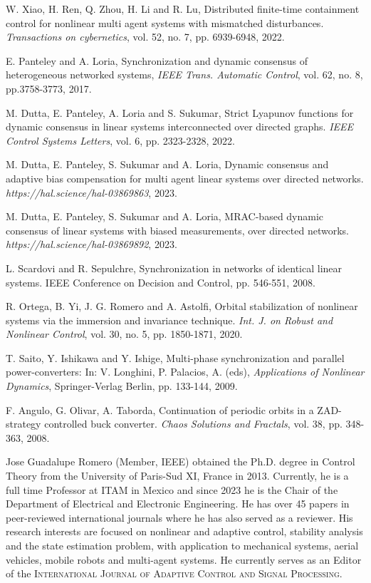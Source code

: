 \documentclass[journal,twoside]{IEEEtran}
\def\TAC{{\it IEEE Trans. Automat. Contr.}}
\def\IJRNLC{{\it Int. J. on Robust and Nonlinear Control}}
\def\TAC{{\it IEEE Trans. Automatic Control}}
\begin{document}
\begin{thebibliography}{00}
W. Xiao, H. Ren, Q. Zhou, H. Li and R. Lu, Distributed finite-time containment control for nonlinear multi agent systems with mismatched disturbances. {\it Transactions on cybernetics}, vol. 52, no. 7, pp. 6939-6948, 2022.

E. Panteley and A. Loria, Synchronization and dynamic consensus of heterogeneous networked systems, \TAC, vol. 62, no. 8, pp.3758-3773, 2017.

M. Dutta, E. Panteley, A. Loria and S. Sukumar, Strict Lyapunov functions for dynamic consensus in linear systems interconnected over directed graphs. {\it IEEE Control Systems Letters}, vol. 6, pp. 2323-2328, 2022. 

M. Dutta, E. Panteley, S. Sukumar and A. Loria, Dynamic consensus and adaptive bias
compensation for multi agent linear systems over directed networks. {\it https://hal.science/hal-03869863}, 2023.

M. Dutta, E. Panteley, S. Sukumar and A. Loria, MRAC-based dynamic consensus of linear systems with biased measurements, over directed networks. {\it https://hal.science/hal-03869892}, 2023.

L. Scardovi and R. Sepulchre, Synchronization in networks of identical linear systems. {IEEE Conference on Decision and Control}, pp. 546-551, 2008.

R. Ortega, B. Yi, J. G. Romero and A. Astolfi, Orbital stabilization of nonlinear systems via the
immersion and invariance technique. \IJRNLC, vol. 30, no. 5, pp. 1850-1871, 2020.

T. Saito, Y. Ishikawa and Y. Ishige, Multi-phase synchronization and parallel power-converters: In: V. Longhini, P. Palacios, A. (eds), {\it Applications of Nonlinear Dynamics}, Springer-Verlag Berlin, pp. 133-144, 2009. 

F. Angulo, G. Olivar, A. Taborda, Continuation of periodic orbits in a ZAD-strategy controlled buck converter. {\it Chaos Solutions and Fractals}, vol. 38, pp. 348-363, 2008. 
\end{thebibliography}


\begin{IEEEbiography}
{Jose Guadalupe Romero} (Member, IEEE)  obtained the Ph.D. degree in Control Theory from the University of Paris-Sud XI, France in 2013. 
Currently, he is a full time Professor at ITAM in Mexico and since 2023 he is  the Chair of the Department of Electrical and Electronic Engineering. He has over 45 papers in peer-reviewed international journals where he has also served as a reviewer.
His research interests are focused on nonlinear and adaptive control, stability analysis  and the state estimation problem, with application to mechanical systems, aerial vehicles, mobile robots and multi-agent systems. He currently serves as an Editor of the \textsc{International Journal of Adaptive Control and Signal Processing}.
\end{IEEEbiography}
\end{document}
